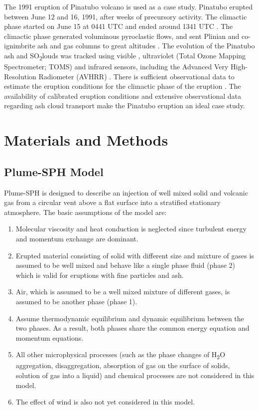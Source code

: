 \documentclass[utf8]{frontiersSCNS} %
\begin{document}
The 1991 eruption of Pinatubo volcano is used as a case study. Pinatubo erupted between June 12 and 16, 1991, after weeks of precursory activity. The climactic phase started on June 15 at 0441 UTC and ended around 1341 UTC \citep{holasek1996satellite}. The climactic phase generated voluminous pyroclastic flows, and sent Plinian and co-ignimbrite ash and gas columns to great altitudes \citep{scott1996pyroclastic}. The evolution of the Pinatubo ash and \texorpdfstring{SO\textsubscript{2}} clouds was tracked using visible \citep{holasek1996satellite}, ultraviolet (Total Ozone Mapping Spectrometer; TOMS) \citep{guo2004re} and infrared sensors, including the Advanced Very High-Resolution Radiometer (AVHRR) \citep{guo2004particles}. There is sufficient observational data to estimate the eruption conditions for the climactic phase of the eruption \citep{suzuki2009three}. The availability of calibrated eruption conditions and extensive observational data regarding ash cloud transport make the Pinatubo eruption an ideal case study.

\section{Materials and Methods} \label{sec:Methodology}

\subsection {Plume-SPH Model} \label{sec:plume-sph}
Plume-SPH  \citep{cao2018plume} is designed to describe an injection of well mixed solid and volcanic gas from a circular vent above a flat surface into a stratified stationary atmosphere. The basic assumptions of the model are: 
\begin{enumerate}
\item Molecular viscosity and heat conduction is neglected since turbulent energy and momentum exchange are dominant.
\item Erupted material consisting of solid with different size and mixture of gases  is assumed to be well mixed and behave like a single phase fluid (phase 2) which is valid for eruptions with fine particles and ash.
\item Air, which is assumed to be a well mixed mixture of different gases, is assumed to be another phase (phase 1).
\item Assume thermodynamic equilibrium and dynamic equilibrium between the two phases. As a result, both phases share the common energy equation and momentum equations.
\item All other microphysical processes (such as the phase changes of \texorpdfstring{H\textsubscript{2}O}, aggregation, disaggregation, absorption of gas on the surface of solids, solution of gas into a liquid) and chemical processes are not considered in this model.
\item The effect of wind is also not yet considered in this model. 
\end{enumerate}
\end{document}
